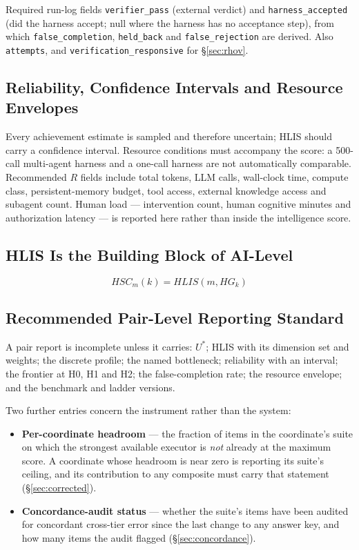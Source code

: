 \documentclass[11pt]{article}
\theoremstyle{definition}
\begin{document}
\begin{claimbox}{Required run-log fields}
\texttt{verifier\_pass} (external verdict) and \texttt{harness\_accepted} (did the harness accept; null where the harness has no acceptance step), from which \texttt{false\_completion}, \texttt{held\_back} and \texttt{false\_rejection} are derived. Also \texttt{attempts}, and \texttt{verification\_responsive} for \S\ref{sec:rhov}.
\end{claimbox}

\subsection{Reliability, Confidence Intervals and Resource Envelopes}\label{sec:resources}

Every achievement estimate is sampled and therefore uncertain; HLIS should carry a confidence interval. Resource conditions must accompany the score: a 500-call multi-agent harness and a one-call harness are not automatically comparable. Recommended $R$ fields include total tokens, LLM calls, wall-clock time, compute class, persistent-memory budget, tool access, external knowledge access and subagent count. Human load --- intervention count, human cognitive minutes and authorization latency --- is reported here rather than inside the intelligence score.

\subsection{HLIS Is the Building Block of AI-Level}

\begin{equation}
HSC_m(k) = HLIS(m, HG_k)
\end{equation}

\subsection{Recommended Pair-Level Reporting Standard}\label{sec:report}

A pair report is incomplete unless it carries: $U^{*}$; HLIS with its dimension set and weights; the discrete profile; the named bottleneck; reliability with an interval; the frontier at H0, H1 and H2; the false-completion rate; the resource envelope; and the benchmark and ladder versions.

Two further entries concern the instrument rather than the system:

\begin{itemize}
\item \textbf{Per-coordinate headroom} --- the fraction of items in the coordinate's suite on which the strongest available executor is \emph{not} already at the maximum score. A coordinate whose headroom is near zero is reporting its suite's ceiling, and its contribution to any composite must carry that statement (\S\ref{sec:corrected}).
\item \textbf{Concordance-audit status} --- whether the suite's items have been audited for concordant cross-tier error since the last change to any answer key, and how many items the audit flagged (\S\ref{sec:concordance}).
\end{itemize}
\end{document}
